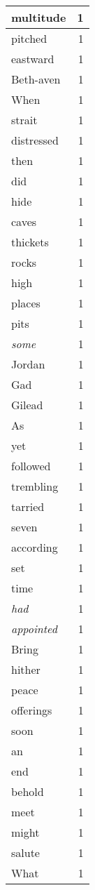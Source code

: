 \begin{center}
\begin{longtable}{l|r}
multitude & 1 \\ \hline
pitched & 1 \\ \hline
eastward & 1 \\ \hline
Beth-aven & 1 \\ \hline
When & 1 \\ \hline
strait & 1 \\ \hline
distressed & 1 \\ \hline
then & 1 \\ \hline
did & 1 \\ \hline
hide & 1 \\ \hline
caves & 1 \\ \hline
thickets & 1 \\ \hline
rocks & 1 \\ \hline
high & 1 \\ \hline
places & 1 \\ \hline
pits & 1 \\ \hline
\emph{some} & 1 \\ \hline
Jordan & 1 \\ \hline
Gad & 1 \\ \hline
Gilead & 1 \\ \hline
As & 1 \\ \hline
yet & 1 \\ \hline
followed & 1 \\ \hline
trembling & 1 \\ \hline
tarried & 1 \\ \hline
seven & 1 \\ \hline
according & 1 \\ \hline
set & 1 \\ \hline
time & 1 \\ \hline
\emph{had} & 1 \\ \hline
\emph{appointed} & 1 \\ \hline
Bring & 1 \\ \hline
hither & 1 \\ \hline
peace & 1 \\ \hline
offerings & 1 \\ \hline
soon & 1 \\ \hline
an & 1 \\ \hline
end & 1 \\ \hline
behold & 1 \\ \hline
meet & 1 \\ \hline
might & 1 \\ \hline
salute & 1 \\ \hline
What & 1 \\ \hline

\end{longtable}
\end{center}
